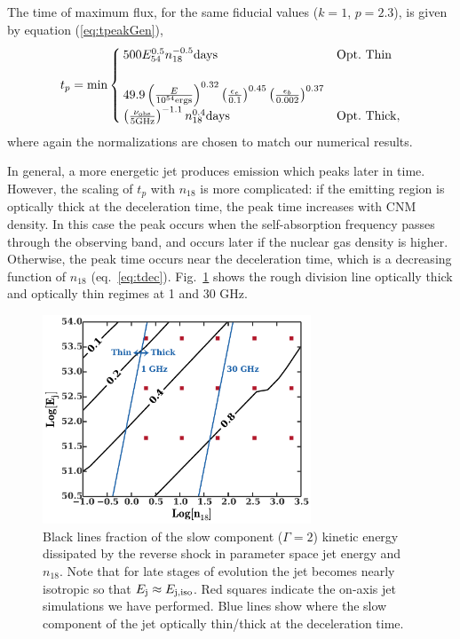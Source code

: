 \documentclass[usenatbib,fleqn]{mnras}
\begin{document}
The time of maximum flux, for the same fiducial values ($k = 1$,
$p=2.3$), is given by equation (\ref{eq:tpeakGen}),
\begin{align}
t_p= \text{min}
\begin{cases}
  500 E_{54}^{0.5} n_{18}^{-0.5} {\rm days} & {\rm Opt.~Thin}\\\\
  49.9 \left(\frac{E}{10^{54} {\rm ergs}}\right)^{0.32}
  \left(\frac{\epsilon_e}{0.1}\right)^{0.45}
  \left(\frac{\epsilon_b}{0.002}\right)^{0.37}\\
  \left(\frac{\nu_{\rm obs}}{5 {\rm GHz}}\right)^{-1.1} n_{18}^{0.4}
  {\rm days}& {\rm Opt.~Thick},
\end{cases}
\label{eq:peakTime}
\end{align}
where again the normalizations are chosen to match our numerical
results. 

In general, a more energetic jet produces emission which
peaks later in time.  However, the scaling of $t_p$ with $n_{18}$ is
more complicated: if the emitting region is optically thick at the
deceleration time, the peak time increases with CNM density. In this
case the peak occurs when the self-absorption frequency passes through
the observing band, and occurs later if the nuclear gas density is
higher. Otherwise, the peak time occurs near the deceleration time,
which is a decreasing function of $n_{18}$ (eq.~\ref{eq:tdec}).
Fig.~\ref{fig:diss} shows the rough division line optically thick and
optically thin regimes at 1 and 30 GHz.

\begin{figure}
\includegraphics[width=8cm]{diss.pdf}
\caption{\label{fig:diss} Black lines fraction of the slow component
  ($\Gamma=2$) kinetic energy dissipated by the reverse shock in
  parameter space jet energy and $n_{18}$. Note that for late stages
  of evolution the jet becomes nearly isotropic so that $E_{\rm
    j}\approx E_{\rm j, iso}$. Red squares indicate the on-axis jet
  simulations we have performed. Blue lines show where the slow
  component of the jet optically thin/thick at the deceleration time.}
\end{figure}
\end{document}
